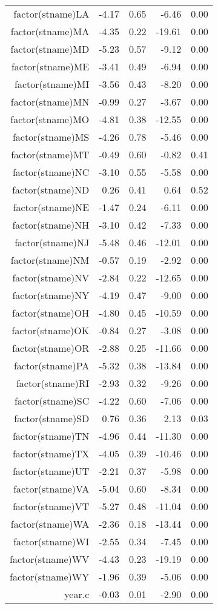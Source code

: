 \begin{table}[ht]
\begin{tabular}{rrrrr}
  factor(stname)LA & -4.17 & 0.65 & -6.46 & 0.00 \\ 
  factor(stname)MA & -4.35 & 0.22 & -19.61 & 0.00 \\ 
  factor(stname)MD & -5.23 & 0.57 & -9.12 & 0.00 \\ 
  factor(stname)ME & -3.41 & 0.49 & -6.94 & 0.00 \\ 
  factor(stname)MI & -3.56 & 0.43 & -8.20 & 0.00 \\ 
  factor(stname)MN & -0.99 & 0.27 & -3.67 & 0.00 \\ 
  factor(stname)MO & -4.81 & 0.38 & -12.55 & 0.00 \\ 
  factor(stname)MS & -4.26 & 0.78 & -5.46 & 0.00 \\ 
  factor(stname)MT & -0.49 & 0.60 & -0.82 & 0.41 \\ 
  factor(stname)NC & -3.10 & 0.55 & -5.58 & 0.00 \\ 
  factor(stname)ND & 0.26 & 0.41 & 0.64 & 0.52 \\ 
  factor(stname)NE & -1.47 & 0.24 & -6.11 & 0.00 \\ 
  factor(stname)NH & -3.10 & 0.42 & -7.33 & 0.00 \\ 
  factor(stname)NJ & -5.48 & 0.46 & -12.01 & 0.00 \\ 
  factor(stname)NM & -0.57 & 0.19 & -2.92 & 0.00 \\ 
  factor(stname)NV & -2.84 & 0.22 & -12.65 & 0.00 \\ 
  factor(stname)NY & -4.19 & 0.47 & -9.00 & 0.00 \\ 
  factor(stname)OH & -4.80 & 0.45 & -10.59 & 0.00 \\ 
  factor(stname)OK & -0.84 & 0.27 & -3.08 & 0.00 \\ 
  factor(stname)OR & -2.88 & 0.25 & -11.66 & 0.00 \\ 
  factor(stname)PA & -5.32 & 0.38 & -13.84 & 0.00 \\ 
  factor(stname)RI & -2.93 & 0.32 & -9.26 & 0.00 \\ 
  factor(stname)SC & -4.22 & 0.60 & -7.06 & 0.00 \\ 
  factor(stname)SD & 0.76 & 0.36 & 2.13 & 0.03 \\ 
  factor(stname)TN & -4.96 & 0.44 & -11.30 & 0.00 \\ 
  factor(stname)TX & -4.05 & 0.39 & -10.46 & 0.00 \\ 
  factor(stname)UT & -2.21 & 0.37 & -5.98 & 0.00 \\ 
  factor(stname)VA & -5.04 & 0.60 & -8.34 & 0.00 \\ 
  factor(stname)VT & -5.27 & 0.48 & -11.04 & 0.00 \\ 
  factor(stname)WA & -2.36 & 0.18 & -13.44 & 0.00 \\ 
  factor(stname)WI & -2.55 & 0.34 & -7.45 & 0.00 \\ 
  factor(stname)WV & -4.43 & 0.23 & -19.19 & 0.00 \\ 
  factor(stname)WY & -1.96 & 0.39 & -5.06 & 0.00 \\ 
  year.c & -0.03 & 0.01 & -2.90 & 0.00 \\ 
   \hline
\end{tabular}
\end{table}
